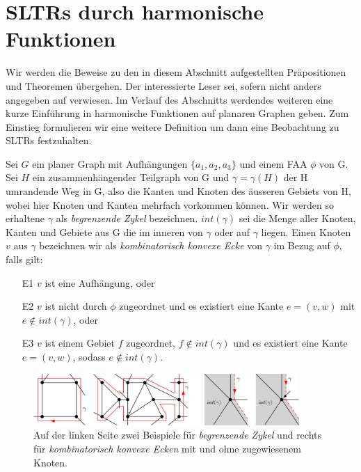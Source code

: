 \section{SLTRs durch harmonische Funktionen}

Wir werden die Beweise zu den in diesem Abschnitt aufgestellten Präpositionen und Theoremen übergehen. Der interessierte Leser sei, sofern nicht anders angegeben auf \cite{af13} verwiesen. Im Verlauf des Abschnitts werdendes weiteren eine kurze Einführung in harmonische Funktionen auf planaren Graphen geben. Zum Einstieg formulieren wir eine weitere Definition um dann eine Beobachtung zu SLTRs festzuhalten.

\begin{definition}
Sei $G$ ein planer Graph mit Aufhängungen $\{a_1,a_2,a_3\}$ und einem FAA $\phi$ von G. Sei $H$ ein zusammenhängender Teilgraph von G und $\gamma=\gamma(H)$ der H umrandende Weg in G, also die Kanten und Knoten des äusseren Gebiets von H, wobei hier Knoten und Kanten mehrfach vorkommen können. Wir werden so erhaltene $\gamma$ als \textit{begrenzende Zykel} bezeichnen. $int(\gamma)$ sei die Menge aller Knoten, Kanten und Gebiete aus G die im inneren von $\gamma$ oder auf $\gamma$ liegen. Einen Knoten $v$ aus $\gamma$ bezeichnen wir als \textit{kombinatorisch konvexe Ecke} von $\gamma$ im Bezug auf $\phi$, falls gilt:
\begin{itemize}
\item [E1] $v$ ist eine Aufhängung, oder
\item [E2] $v$ ist nicht durch $\phi$ zugeordnet und es existiert eine Kante $e = (v,w)$ mit $e \notin int(\gamma)$, oder
\item [E3] $v$ ist einem Gebiet $f$ zugeordnet, $f \notin int(\gamma)$ und es existiert eine Kante $e = (v,w)$, sodass $e \notin int(\gamma)$.
\end{itemize}

\end{definition}

\begin{figure}[h]
	\centering
  \includegraphics[width=0.9\textwidth]{corner_def.png}
  \caption{Auf der linken Seite zwei Beispiele für \textit{begrenzende Zykel} und rechts für \textit{kombinatorisch konvexe Ecken} mit und ohne zugewiesenem Knoten.}
\end{figure}

